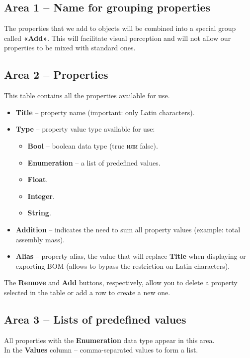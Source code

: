 \documentclass[a4paper,12pt]{article}
\begin{document}
\subsection{Area 1 -- Name for grouping properties}
The properties that we add to objects will be combined into a special group called \textbf{«Add»}. This will facilitate visual perception and will not allow our properties to be mixed with standard ones.

\pagebreak


\subsection{Area 2 -- Properties}

This table contains all the properties available for use.
\begin{itemize}
	\item \textbf{Title} -- property name (important: only Latin characters).
	\item \textbf{Type} -- property value type available for use:
	\begin{itemize}
		\item \textbf{Bool} -- boolean data type (true или false).
		\item \textbf{Enumeration} -- a list of predefined values.
		\item \textbf{Float}.
		\item \textbf{Integer}.
		\item \textbf{String}.
	\end{itemize}
	\item \textbf{Addition} -- indicates the need to sum all property values ​​(example: total assembly mass).
	\item \textbf{Alias} -- property alias, the value that will replace \textbf{Title} when displaying or exporting BOM (allows to bypass the restriction on Latin characters).
\end{itemize}

\begin{flushleft}The \textbf{Remove} and \textbf{Add} buttons, respectively, allow you to delete a property selected in the table or add a row to create a new one.\end{flushleft}

\subsection{Area 3 -- Lists of predefined values}
All properties with the \textbf{Enumeration} data type appear in this area.\\In the \textbf{Values} ​​column -- comma-separated values ​​to form a list.
\end{document}
